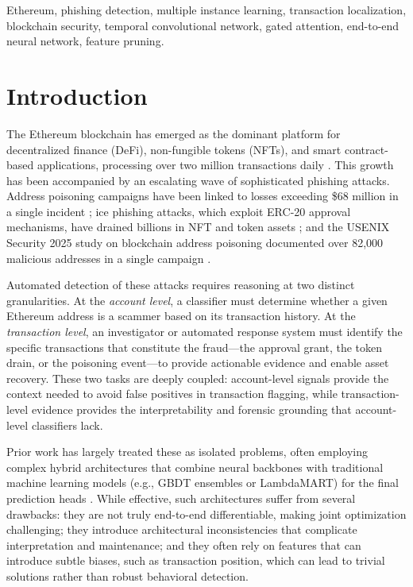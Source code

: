 \documentclass[conference]{IEEEtran}
\begin{document}
\begin{IEEEkeywords}
Ethereum, phishing detection, multiple instance learning, transaction localization, blockchain security, temporal convolutional network, gated attention, end-to-end neural network, feature pruning.
\end{IEEEkeywords}

\section{Introduction}
The Ethereum blockchain has emerged as the dominant platform for decentralized finance (DeFi), non-fungible tokens (NFTs), and smart contract-based applications, processing over two million transactions daily \cite{etherscan}. This growth has been accompanied by an escalating wave of sophisticated phishing attacks. Address poisoning campaigns have been linked to losses exceeding \$68 million in a single incident \cite{address_poisoning}; ice phishing attacks, which exploit ERC-20 approval mechanisms, have drained billions in NFT and token assets \cite{ice_phishing}; and the USENIX Security 2025 study on blockchain address poisoning documented over 82,000 malicious addresses in a single campaign \cite{usenix_poisoning}.

Automated detection of these attacks requires reasoning at two distinct granularities. At the \emph{account level}, a classifier must determine whether a given Ethereum address is a scammer based on its transaction history. At the \emph{transaction level}, an investigator or automated response system must identify the specific transactions that constitute the fraud---the approval grant, the token drain, or the poisoning event---to provide actionable evidence and enable asset recovery. These two tasks are deeply coupled: account-level signals provide the context needed to avoid false positives in transaction flagging, while transaction-level evidence provides the interpretability and forensic grounding that account-level classifiers lack.

Prior work has largely treated these as isolated problems, often employing complex hybrid architectures that combine neural backbones with traditional machine learning models (e.g., GBDT ensembles or LambdaMART) for the final prediction heads \cite{bert4eth, zipzap, lmae4eth}. While effective, such architectures suffer from several drawbacks: they are not truly end-to-end differentiable, making joint optimization challenging; they introduce architectural inconsistencies that complicate interpretation and maintenance; and they often rely on features that can introduce subtle biases, such as transaction position, which can lead to trivial solutions rather than robust behavioral detection.
\end{document}
